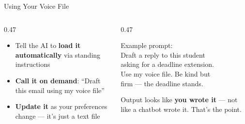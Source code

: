 \documentclass[aspectratio=169, 10pt]{beamer}
\begin{document}
\begin{frame}{Using Your Voice File}
\begin{columns}[T]
\begin{column}{0.47\textwidth}
\begin{tcolorbox}[keybox, title={\faPen\quad Once the file exists}]
\small
\begin{itemize}\setlength{\itemsep}{2pt}
  \item Tell the AI to \textbf{load it automatically} via standing instructions
  \item \textbf{Call it on demand}: ``Draft this email using my voice file''
  \item \textbf{Update it} as your preferences change --- it's just a text file
\end{itemize}
\end{tcolorbox}
\end{column}
\begin{column}{0.47\textwidth}
\begin{tcolorbox}[colback=DarkSlate, colframe=DarkSlate, arc=3pt, left=6pt, right=6pt, top=4pt, bottom=4pt]
{\color{CoolGray}\ttfamily\tiny Example prompt:\\[2pt]
\color{white}\scriptsize
Draft a reply to this student\\
asking for a deadline extension.\\
Use my voice file. Be kind but\\
firm --- the deadline stands.
}
\end{tcolorbox}
\vskip3pt
\begin{tcolorbox}[quotebox, top=3pt, bottom=3pt]
\small Output looks like \textbf{you wrote it} --- not like a chatbot wrote it. That's the point.
\end{tcolorbox}
\end{column}
\end{columns}
\end{frame}
\end{document}
